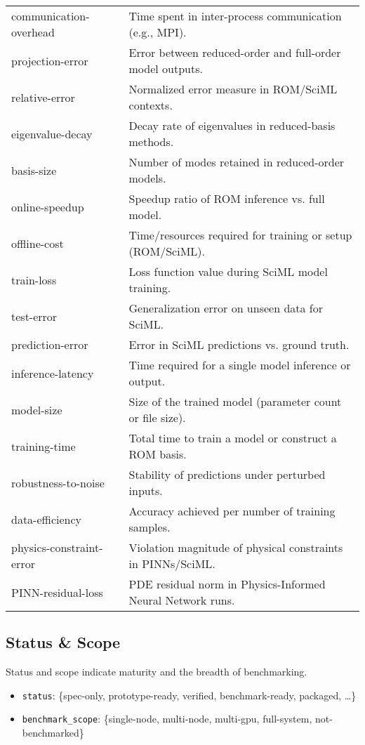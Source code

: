 \begin{longtable}{@{}p{}p{}@{}}
communication-overhead     & Time spent in inter-process communication (e.g., MPI). \\
projection-error           & Error between reduced-order and full-order model outputs. \\
relative-error             & Normalized error measure in ROM/SciML contexts. \\
eigenvalue-decay           & Decay rate of eigenvalues in reduced-basis methods. \\
basis-size                 & Number of modes retained in reduced-order models. \\
online-speedup             & Speedup ratio of ROM inference vs. full model. \\
offline-cost               & Time/resources required for training or setup (ROM/SciML). \\
train-loss                 & Loss function value during SciML model training. \\
test-error                 & Generalization error on unseen data for SciML. \\
prediction-error           & Error in SciML predictions vs. ground truth. \\
inference-latency          & Time required for a single model inference or output. \\
model-size                 & Size of the trained model (parameter count or file size). \\
training-time              & Total time to train a model or construct a ROM basis. \\
robustness-to-noise        & Stability of predictions under perturbed inputs. \\
data-efficiency            & Accuracy achieved per number of training samples. \\
physics-constraint-error   & Violation magnitude of physical constraints in PINNs/SciML. \\
PINN-residual-loss         & PDE residual norm in Physics-Informed Neural Network runs. \\

\bottomrule
\end{longtable}

\subsection{Status \& Scope}
Status and scope indicate maturity and the breadth of benchmarking.
\begin{itemize}
  \item \texttt{status}: \{spec-only, prototype-ready, verified, benchmark-ready, packaged, …\}  
  \item \texttt{benchmark\_scope}: \{single-node, multi-node, multi-gpu, full-system, not-benchmarked\}
\end{itemize}

